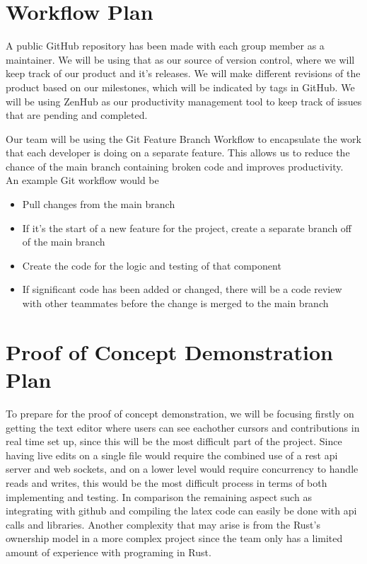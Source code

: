 \documentclass{article}
\begin{document}
\section{Workflow Plan}

A public GitHub repository has been made with each group member as a maintainer. We will be using that as our source of version control, where we will keep track of our product and it's releases. We will make different revisions of the product based on our milestones, which will be indicated by tags in GitHub. We will be using ZenHub as our productivity management tool to keep track of issues that are pending and completed. 

Our team will be using the Git Feature Branch Workflow to encapsulate the work that each developer is doing on a separate feature. This allows us to reduce the chance of the main branch containing broken code and improves productivity.\\

An example Git workflow would be 
\begin{itemize}
    \item Pull changes from the main branch
    \item If it's the start of a new feature for the project, create a separate branch off of the main branch
    \item Create the code for the logic and testing of that component
    \item If significant code has been added or changed, there will be a code review with other teammates before the change is merged to the main branch
\end{itemize}

\section{Proof of Concept Demonstration Plan}

To prepare for the proof of concept demonstration, we will be focusing firstly on getting the text editor where users can see eachother cursors and contributions in real time set up, since this will be the most difficult part of the project.
Since having live edits on a single file would require the combined use of a rest api server and web sockets, and on a lower level would require concurrency to handle reads and writes, this would be the most difficult process in terms of 
both implementing and testing. In comparison the remaining aspect such as integrating with github and compiling the latex code can easily be done with api calls and libraries. Another complexity that may arise is from the Rust's ownership
model in a more complex project since the team only has a limited amount of experience with programing in Rust.\\
\end{document}
